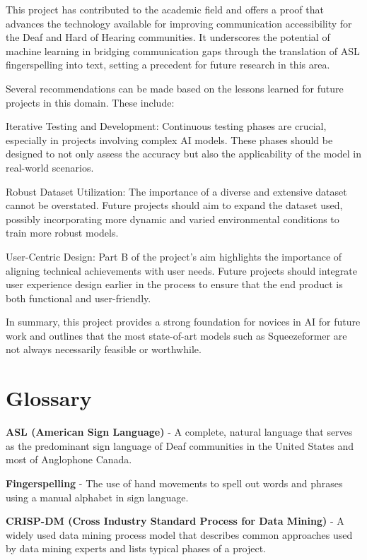 \documentclass[preprint,11pt,review,authoryear]{elsarticle}
\begin{document}
This project has contributed to the academic field and offers a proof that advances the technology available for improving communication accessibility for the Deaf and Hard of Hearing communities. It underscores the potential of machine learning in bridging communication gaps through the translation of ASL fingerspelling into text, setting a precedent for future research in this area.

Several recommendations can be made based on the lessons learned for future projects in this domain. These include:

Iterative Testing and Development: Continuous testing phases are crucial, especially in projects involving complex AI models. These phases should be designed to not only assess the accuracy but also the applicability of the model in real-world scenarios.

Robust Dataset Utilization: The importance of a diverse and extensive dataset cannot be overstated. Future projects should aim to expand the dataset used, possibly incorporating more dynamic and varied environmental conditions to train more robust models.

User-Centric Design: Part B of the project's aim highlights the importance of aligning technical achievements with user needs. Future projects should integrate user experience design earlier in the process to ensure that the end product is both functional and user-friendly.

In summary, this project provides a strong foundation for novices in AI for future work and outlines that the most state-of-art models such as Squeezeformer are not always necessarily feasible or worthwhile.

\clearpage



\newpage
\onecolumn
\section{Glossary} \label{A}
\renewcommand{\thepage}{A\arabic{page}}
\newpage
\textbf{ASL (American Sign Language)} - A complete, natural language that serves as the predominant sign language of Deaf communities in the United States and most of Anglophone Canada.

\textbf{Fingerspelling} - The use of hand movements to spell out words and phrases using a manual alphabet in sign language.

\textbf{CRISP-DM (Cross Industry Standard Process for Data Mining)} - A widely used data mining process model that describes common approaches used by data mining experts and lists typical phases of a project.
\end{document}
